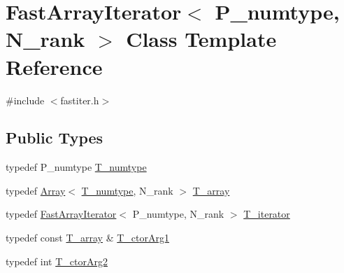 \hypertarget{classFastArrayIterator}{}\section{Fast\+Array\+Iterator$<$ P\+\_\+numtype, N\+\_\+rank $>$ Class Template Reference}
\label{classFastArrayIterator}


{\ttfamily \#include $<$fastiter.\+h$>$}

\subsection*{Public Types}
\begin{DoxyCompactItemize}
\item 
typedef P\+\_\+numtype \hyperlink{classFastArrayIterator_a6b72f4ef8bfecc51f2f93b89b21d5033}{T\+\_\+numtype}
\item 
typedef \hyperlink{classArray}{Array}$<$ \hyperlink{classFastArrayIterator_a6b72f4ef8bfecc51f2f93b89b21d5033}{T\+\_\+numtype}, N\+\_\+rank $>$ \hyperlink{classFastArrayIterator_a8cf906d33462b33342b5155db7087127}{T\+\_\+array}
\item 
typedef \hyperlink{classFastArrayIterator}{Fast\+Array\+Iterator}$<$ P\+\_\+numtype, N\+\_\+rank $>$ \hyperlink{classFastArrayIterator_a93b95c134eeedaadf14d43ea36d4e06b}{T\+\_\+iterator}
\item 
typedef const \hyperlink{classFastArrayIterator_a8cf906d33462b33342b5155db7087127}{T\+\_\+array} \& \hyperlink{classFastArrayIterator_a78d43778efa23cdb4ed68c6de5bb13d1}{T\+\_\+ctor\+Arg1}
\item 
typedef int \hyperlink{classFastArrayIterator_afc4a3171af47174bef4dcea96af02634}{T\+\_\+ctor\+Arg2}
\end{DoxyCompactItemize}
